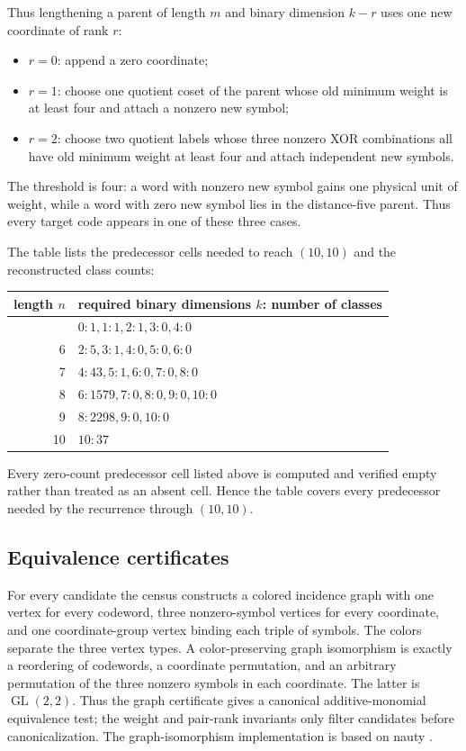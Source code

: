 \documentclass[11pt]{article}
\providecommand{\tightlist}{\setlength{\itemsep}{0pt}\setlength{\parskip}{0pt}}
\begin{document}
Thus lengthening a parent of length \(m\) and binary dimension \(k-r\) uses one new coordinate of rank \(r\):

\begin{itemize}
\tightlist
\item
  \(r=0\): append a zero coordinate;
\item
  \(r=1\): choose one quotient coset of the parent whose old minimum weight is at least four and attach a nonzero new symbol;
\item
  \(r=2\): choose two quotient labels whose three nonzero XOR combinations all have old minimum weight at least four and attach independent new symbols.
\end{itemize}

The threshold is four: a word with nonzero new symbol gains one physical unit of weight, while a word with zero new symbol lies in the distance-five parent. Thus every target code appears in one of these three cases.

The table lists the predecessor cells needed to reach \((10,10)\) and the reconstructed class counts:

{\def\LTcaptype{none} %
\begin{longtable}[]{@{}rl@{}}
\toprule\noalign{}
length \(n\) & required binary dimensions \(k\): number of classes \\
\midrule\noalign{}
\endhead
\bottomrule\noalign{}
\endlastfoot
5 & \(0:1, 1:1, 2:1, 3:0, 4:0\) \\
6 & \(2:5, 3:1, 4:0, 5:0, 6:0\) \\
7 & \(4:43, 5:1, 6:0, 7:0, 8:0\) \\
8 & \(6:1579, 7:0, 8:0, 9:0, 10:0\) \\
9 & \(8:2298, 9:0, 10:0\) \\
10 & \(10:37\) \\
\end{longtable}
}

Every zero-count predecessor cell listed above is computed and verified empty rather than treated as an absent cell. Hence the table covers every predecessor needed by the recurrence through \((10,10)\).

\subsection{Equivalence certificates}\label{equivalence-certificates}

For every candidate the census constructs a colored incidence graph with one vertex for every codeword, three nonzero-symbol vertices for every coordinate, and one coordinate-group vertex binding each triple of symbols. The colors separate the three vertex types. A color-preserving graph isomorphism is exactly a reordering of codewords, a coordinate permutation, and an arbitrary permutation of the three nonzero symbols in each coordinate. The latter is \(\operatorname{GL}(2,2)\). Thus the graph certificate gives a canonical additive-monomial equivalence test; the weight and pair-rank invariants only filter candidates before canonicalization. The graph-isomorphism implementation is based on nauty \cite{mckay-piperno}.
\end{document}
